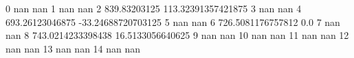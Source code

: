 0 nan nan
1 nan nan
2 839.83203125 113.32391357421875
3 nan nan
4 693.26123046875 -33.24688720703125
5 nan nan
6 726.5081176757812 0.0
7 nan nan
8 743.0214233398438 16.5133056640625
9 nan nan
10 nan nan
11 nan nan
12 nan nan
13 nan nan
14 nan nan
